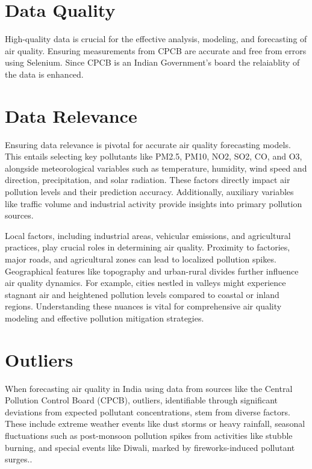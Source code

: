  \section{Data Quality}
 
High-quality data is crucial for the effective analysis, modeling, and forecasting of air quality. Ensuring measurements from CPCB are accurate and free from errors using Selenium. Since CPCB is an Indian Government’s board the relaiablity of the data is enhanced.

\section{Data Relevance}
 Ensuring data relevance is pivotal for accurate air quality forecasting models. This entails selecting key pollutants like PM2.5, PM10, NO2, SO2, CO, and O3, alongside meteorological variables such as temperature, humidity, wind speed and direction, precipitation, and solar radiation. These factors directly impact air pollution levels and their prediction accuracy. Additionally, auxiliary variables like traffic volume and industrial activity provide insights into primary pollution sources.
 
 \bigskip
 
 Local factors, including industrial areas, vehicular emissions, and agricultural practices, play crucial roles in determining air quality. Proximity to factories, major roads, and agricultural zones can lead to localized pollution spikes. Geographical features like topography and urban-rural divides further influence air quality dynamics. For example, cities nestled in valleys might experience stagnant air and heightened pollution levels compared to coastal or inland regions. Understanding these nuances is vital for comprehensive air quality modeling and effective pollution mitigation strategies\cite{Smith:2019}. 
 
\section{Outliers}

When forecasting air quality in India using data from sources like the Central Pollution Control Board (CPCB), outliers, identifiable through significant deviations from expected pollutant concentrations, stem from diverse factors. These include extreme weather events like dust storms or heavy rainfall, seasonal fluctuations such as post-monsoon pollution spikes from activities like stubble burning, and special events like Diwali, marked by fireworks-induced pollutant surges.\cite{CPCB:2023}.

